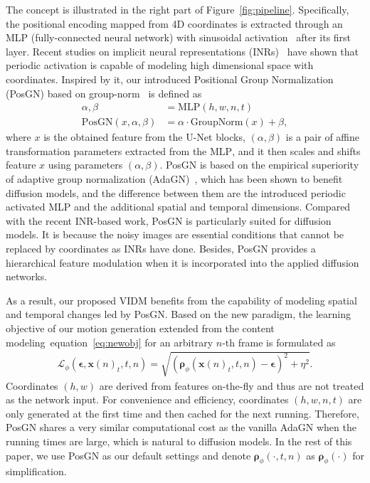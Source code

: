 \documentclass[letterpaper]{article}
\def\eqref#1{equation~\ref{#1}}
\newcommand{\bx}{\mathbf{x}}
\newcommand{\bepsilon}{{\boldsymbol{\epsilon}}}
\newcommand{\brho}{{\boldsymbol{\rho}}}
\begin{document}
The concept is illustrated in the right part of Figure~\ref{fig:pipeline}.
Specifically, the positional encoding mapped from 4D coordinates is extracted through an MLP (fully-connected neural network) with sinusoidal activation~\cite{sitzmann2020implicit} after its first layer.
Recent studies on implicit neural representations (INRs)~\cite{sitzmann2020implicit,tancik2020fourier} have shown that periodic activation is capable of modeling high dimensional space with coordinates.
Inspired by it, our introduced Positional Group Normalization (PosGN) based on group-norm~\cite{wu2018group} is defined as 
\begin{align}
  \alpha, \beta &= \text{MLP}(h,w,n,t)\\
  \text{PosGN}(x, \alpha, \beta) &= \alpha \cdot \text{GroupNorm}(x) + \beta,
\end{align}
where $x$ is the obtained feature from the U-Net blocks, $(\alpha, \beta)$ is a pair of affine transformation parameters extracted from the $\text{MLP}$, and it then scales and shifts feature $x$ using parameters $(\alpha, \beta)$.
PosGN is based on the empirical superiority of adaptive group normalization (AdaGN)~\cite{nichol2021improved}, which has been shown to benefit diffusion models, and the difference between them are the introduced periodic activated MLP and the additional spatial and temporal dimensions.
Compared with the recent INR-based work, PosGN is particularly suited for diffusion models.
It is because the noisy images are essential conditions that cannot be replaced by coordinates as INRs have done.
Besides, PosGN provides a hierarchical feature modulation when it is incorporated into the applied diffusion networks.

As a result, our proposed VIDM benefits from the capability of modeling spatial and temporal changes led by PosGN.
Based on the new paradigm, the learning objective of our motion generation extended from the content modeling~\eqref{eq:newobj} for an arbitrary $n$-th frame is formulated as 
\begin{align}
  \mathcal{L}_\phi(\bepsilon, \bx(n)_t, t, n) = \sqrt{(\brho_\phi(\bx(n)_t, t, n) - \bepsilon)^2 + \eta^2}.
\end{align}
Coordinates $(h,w)$ are derived from features on-the-fly and thus are not treated as the network input.
For convenience and efficiency, coordinates $(h,w,n,t)$ are only generated at the first time and then cached for the next running.
Therefore, PosGN shares a very similar computational cost as the vanilla AdaGN when the running times are large, which is natural to diffusion models.
In the rest of this paper, we use PosGN as our default settings and denote $\brho_\phi(\cdot, t, n)$ as $\brho_\phi(\cdot)$ for simplification.
\end{document}
